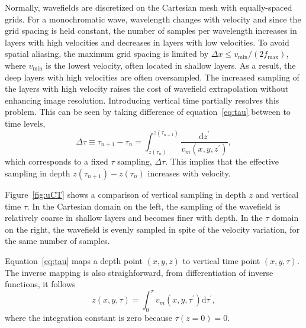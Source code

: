 Normally, wavefields are discretized on the Cartesian mesh with equally-spaced grids. For a monochromatic wave, wavelength changes with velocity and since the grid spacing is held constant, the number of samples per wavelength increases in layers with high velocities and decreases in layers with low velocities.
To avoid spatial aliasing, the maximum grid spacing is limited by $\Delta x \leq v_{\min} / (2 f_{\max})$, where $v_{\min}$ is the lowest velocity, often located in shallow layers.
As a result, the deep layers with high velocities are often oversampled. The increased sampling of the layers with high velocity raises the cost of wavefield extrapolation without enhancing image resolution. Introducing vertical time partially resolves this problem. This can be seen by taking difference of equation~\ref{eq:tau} between to time levels,
\begin{equation}
\Delta\tau \equiv \tau_{n+1} - \tau_{n} = \int_{z(\tau_n)}^{z(\tau_{n+1})} \frac{\mathrm{d} z^\prime}{v_m(x,y,z^\prime)} ,
\end{equation}
which corresponds to a fixed $\tau$ sampling, $\Delta\tau$.  This implies that the effective sampling in depth $z(\tau_{n+1}) - z(\tau_n)$ increases with velocity.

Figure~\ref{fig:uCT} shows a comparison of vertical sampling in depth $z$ and vertical time $\tau$. 
In the Cartesian domain on the left, the sampling of the wavefield is relatively coarse in shallow layers and becomes finer with depth. In the $\tau$ domain on the right, the wavefield is evenly sampled in spite of the velocity variation, for the same number of samples.

Equation~\ref{eq:tau} maps a depth point $(x,y,z)$ to vertical time point $(x,y,\tau)$.
The inverse mapping is also straighforward, from differentiation of inverse functions, it follows
\begin{equation}
  \label{eq:z}
  z(x,y,\tau) = \int_0^\tau v_m(x,y,\tau^\prime) \mathrm{d} \tau^\prime ,
\end{equation}
where the integration constant is zero because $\tau(z=0)=0$.

